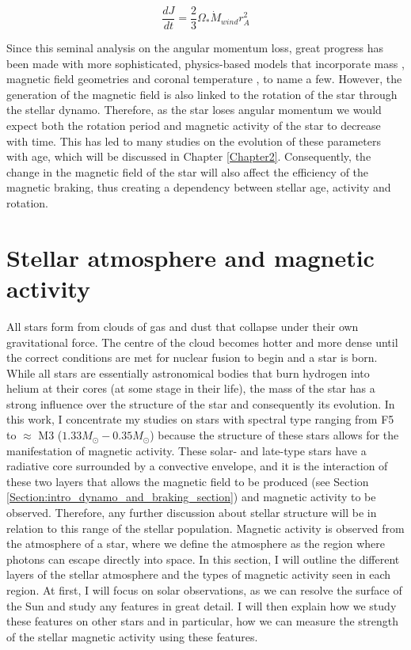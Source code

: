 \begin{equation}
    \frac{dJ}{dt} = \frac{2}{3}\Omega_{*}\dot{M}_{wind}r_{A}^{2}
    \label{Eq:WD67_mag_braking}
\end{equation}

Since this seminal analysis on the angular momentum loss, great progress has been made with more sophisticated, physics-based models that incorporate mass \citep{Matt_etal_2015}, magnetic field geometries \citep{Finley_etal_2017,Garraffo_etal_2018} and coronal temperature \citep{Pantolmos_etal_2017}, to name a few. However, the generation of the magnetic field is also linked to the rotation of the star through the stellar dynamo. Therefore, as the star loses angular momentum we would expect both the rotation period and magnetic activity of the star to decrease with time. This has led to many studies on the evolution of these parameters with age, which will be discussed in Chapter \ref{Chapter2}. Consequently, the change in the magnetic field of the star will also affect the efficiency of the magnetic braking, thus creating a dependency between  stellar age, activity and rotation.

\section{Stellar atmosphere and magnetic activity}
\label{Section:intro_stellar_structure}

All stars form from clouds of gas and dust that collapse under their own gravitational force. The centre of the cloud becomes hotter and more dense until the correct conditions are met for nuclear fusion to begin and a star is born. While all stars are essentially astronomical bodies that burn hydrogen into helium at their cores (at some stage in their life), the mass of the star has a strong influence over the structure of the star and consequently its evolution. In this work, I concentrate my studies on stars with spectral type ranging from F5 to $\approx$ M3 ($1.33 M_{\odot} - 0.35 M_{\odot}$) because the structure of these stars allows for the manifestation of magnetic activity. These solar- and late-type stars have a radiative core surrounded by a convective envelope, and it is the interaction of these two layers that allows the magnetic field to be produced (see Section \ref{Section:intro_dynamo_and_braking_section}) and magnetic activity to be observed. Therefore, any further discussion about stellar structure will be in relation to this range of the stellar population. Magnetic activity is observed from the atmosphere of a star, where we define the atmosphere as the region where photons can escape directly into space. In this section, I will outline the different layers of the stellar atmosphere and the types of magnetic activity seen in each region. At first, I will focus on solar observations, as we can resolve the surface of the Sun and study any features in great detail. I will then explain how we study these features on other stars and in particular, how we can measure the strength of the stellar magnetic activity using these features.


